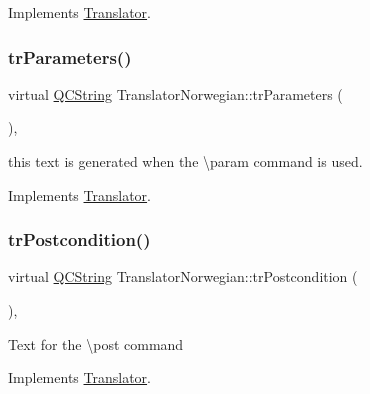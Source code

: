 Implements \mbox{\hyperlink{class_translator}{Translator}}.

\mbox{\label{class_translator_norwegian_a6d3b1c8cab7987a61c80ef039cb3e563}} 
\subsubsection{\texorpdfstring{trParameters()}{trParameters()}}
{\footnotesize\ttfamily virtual \mbox{\hyperlink{class_q_c_string}{Q\+C\+String}} Translator\+Norwegian\+::tr\+Parameters (\begin{DoxyParamCaption}{ }\end{DoxyParamCaption})\hspace{0.3cm}{\ttfamily [inline]}, {\ttfamily [virtual]}}

this text is generated when the \textbackslash{}param command is used. 

Implements \mbox{\hyperlink{class_translator}{Translator}}.

\mbox{\label{class_translator_norwegian_ac21330f4db8f249fc193e9d0363e6089}} 
\subsubsection{\texorpdfstring{trPostcondition()}{trPostcondition()}}
{\footnotesize\ttfamily virtual \mbox{\hyperlink{class_q_c_string}{Q\+C\+String}} Translator\+Norwegian\+::tr\+Postcondition (\begin{DoxyParamCaption}{ }\end{DoxyParamCaption})\hspace{0.3cm}{\ttfamily [inline]}, {\ttfamily [virtual]}}

Text for the \textbackslash{}post command 

Implements \mbox{\hyperlink{class_translator}{Translator}}.

\mbox{\label{class_translator_norwegian_af5d99cff63e361a35082769d6333ee64}} 
